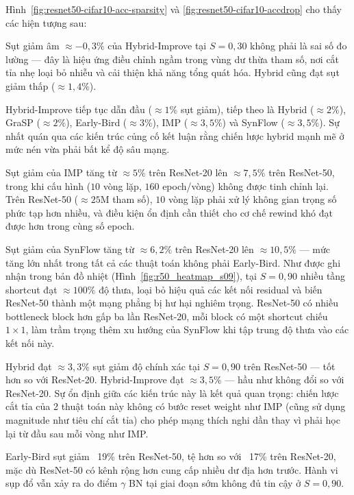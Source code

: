 Hình~\ref{fig:resnet50-cifar10-acc-sparsity} và \ref{fig:resnet50-cifar10-accdrop} cho thấy các hiện tượng sau:

Sụt giảm âm $\approx-0{,}3\%$ của Hybrid-Improve tại $S=0{,}30$ không phải là sai số
đo lường --- đây là hiệu ứng điều chỉnh ngầm trong vùng dư thừa tham số, nơi cắt tỉa
nhẹ loại bỏ nhiễu và cải thiện khả năng tổng quát hóa.
Hybrid cũng đạt sụt giảm thấp ($\approx1{,}4\%$).
 
Hybrid-Improve tiếp tục dẫn đầu ($\approx1\%$ sụt giảm), tiếp theo là Hybrid
($\approx2\%$), GraSP ($\approx2\%$), Early-Bird ($\approx3\%$), IMP ($\approx3{,}5\%$)
và SynFlow ($\approx3{,}5\%$).
Sự nhất quán qua các kiến trúc củng cố kết luận rằng chiến lược hybrid mạnh mẽ ở mức nén
vừa phải bất kể độ sâu mạng.
 
Sụt giảm của IMP tăng từ $\approx5\%$ trên ResNet-20 lên $\approx7{,}5\%$ trên ResNet-50,
trong khi cấu hình ($10$ vòng lặp, $160$ epoch/vòng) không được tinh chỉnh lại.
Trên ResNet-50 ($\approx25$M tham số), $10$ vòng lặp phải xử lý không gian trọng số phức
tạp hơn nhiều, và điều kiện ổn định cần thiết cho cơ chế rewind khó đạt được hơn trong
cùng số epoch.
 
Sụt giảm của SynFlow tăng từ $\approx6{,}2\%$ trên ResNet-20 lên $\approx10{,}5\%$ ---
mức tăng lớn nhất trong tất cả các thuật toán không phải Early-Bird.
Như được ghi nhận trong bản đồ nhiệt (Hình~\ref{fig:r50_heatmap_s09}), tại $S=0{,}90$
nhiều tầng shortcut đạt $\approx100\%$ độ thưa, loại bỏ hiệu quả các kết nối residual và
biến ResNet-50 thành một mạng phẳng bị hư hại nghiêm trọng.
ResNet-50 có nhiều bottleneck block hơn gấp ba lần ResNet-20, mỗi block có một shortcut
chiếu $1{\times}1$, làm trầm trọng thêm xu hướng của SynFlow khi tập trung độ thưa vào các
kết nối này.
 
Hybrid đạt $\approx3{,}3\%$ sụt giảm độ chính xác tại $S=0{,}90$ trên ResNet-50 --- tốt hơn so với
ResNet-20.
Hybrid-Improve đạt $\approx3{,}5\%$ --- hầu như không đổi so với ResNet-20.
Sự ổn định giữa các kiến trúc này là kết quả quan trọng: chiến lược cắt tỉa của 2 thuật toán này không  
có bước reset weight như IMP (cũng sử dụng magnitude như tiêu chí cắt tỉa) cho phép mạng thích nghi dần
thay vì phải học lại từ đầu sau mỗi vòng như IMP.

Early-Bird sụt giảm ~19\% trên ResNet-50, tệ hơn so với ~17\% trên ResNet-20,
mặc dù ResNet-50 có kênh rộng hơn cung cấp nhiều
dư địa hơn trước. Hành vi sụp đổ vẫn xảy ra do điểm $\gamma$ BN tại giai đoạn sớm 
không đủ tin cậy ở $S=0{,}90$.
 

